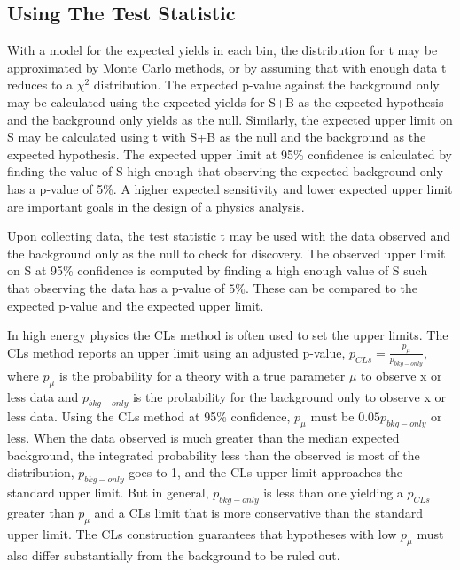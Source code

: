 \subsection{Using The Test Statistic}

With a model for the expected yields in each bin, the distribution for t may be approximated by Monte Carlo methods, or by assuming that with enough data t reduces to a $\chi^2$ distribution. The expected p-value against the background only may be calculated using the expected yields for S+B as the expected hypothesis and the background only yields as the null. Similarly, the expected upper limit on S may be calculated using t with S+B as the null and the background as the expected hypothesis. The expected upper limit at 95\% confidence is calculated by finding the value of S high enough that observing the expected background-only has a p-value of 5\%. A higher expected sensitivity and lower expected upper limit are important goals in the design of a physics analysis.

Upon collecting data, the test statistic t may be used with the data observed and the background only as the null to check for discovery. The observed upper limit on S at 95\% confidence is computed by finding a high enough value of S such that observing the data has a p-value of $5\%$. These can be compared to the expected p-value and the expected upper limit. 
 
In high energy physics the CLs method is often used to set the upper limits. The CLs method reports an upper limit using an adjusted p-value, $p_{CLs} = \frac{p_\mu}{p_{bkg-only}}$, where $p_{\mu}$ is the probability for a theory with a true parameter $\mu$ to observe x or less data and $p_{bkg-only}$ is the probability for the background only to observe x or less data. Using the CLs method at 95\% confidence, $p_\mu$ must be $0.05p_{bkg-only}$ or less. When the data observed is much greater than the median expected background, the integrated probability less than the observed is most of the distribution, $p_{bkg-only}$ goes to 1, and the CLs upper limit approaches the standard upper limit. But in general, $p_{bkg-only}$ is less than one yielding a $p_{CLs}$ greater than $p_\mu$ and a CLs limit that is more conservative than the standard upper limit. The CLs construction guarantees that hypotheses with low $p_{\mu}$ must also differ substantially from the background to be ruled out.   



